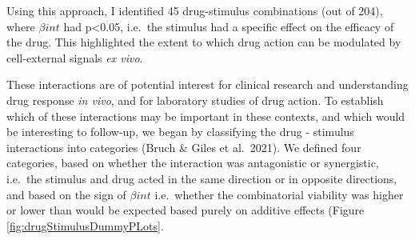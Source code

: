 \documentclass[11pt, a4paper, twosided]{book}
\begin{document}
Using this approach, I identified 45 drug-stimulus combinations (out of 204), where \(\beta{int}\) had p\textless0.05, i.e.~the stimulus had a specific effect on the efficacy of the drug. This highlighted the extent to which drug action can be modulated by cell-external signals \emph{ex vivo}.

These interactions are of potential interest for clinical research and understanding drug response \emph{in vivo}, and for laboratory studies of drug action. To establish which of these interactions may be important in these contexts, and which would be interesting to follow-up, we began by
classifying the drug - stimulus interactions into categories (Bruch \& Giles et al.~2021). We defined four categories, based on whether the interaction was antagonistic or synergistic, i.e.~the stimulus and drug acted in the same direction or in opposite directions, and based on the sign of \(\beta{int}\) i.e.~whether the combinatorial viability was higher or lower than would be expected based purely on additive effects (Figure \ref{fig:drugStimulusDummyPLots}.
\end{document}
